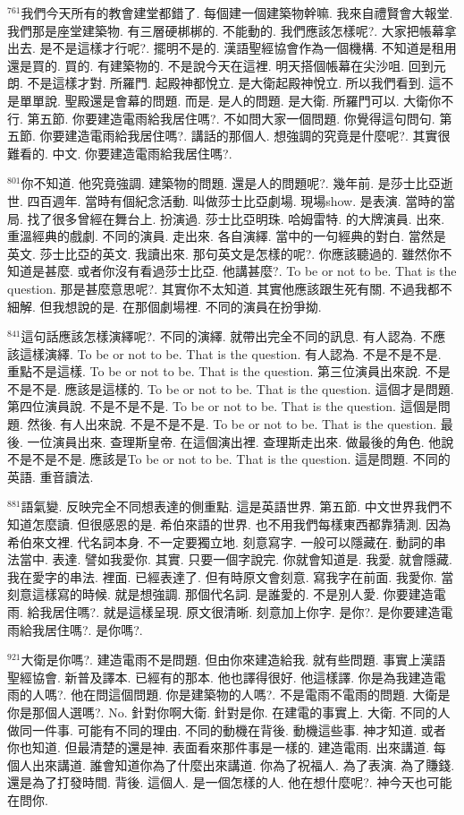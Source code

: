 \documentclass{book}
\begin{document}
$^{761}$我們今天所有的教會建堂都錯了.
每個建一個建築物幹嘛.
我來自禮賢會大報堂.
我們那是座堂建築物.
有三層硬梆梆的.
不能動的.
我們應該怎樣呢?.
大家把帳幕拿出去.
是不是這樣才行呢?.
擺明不是的.
漢語聖經協會作為一個機構.
不知道是租用還是買的.
買的.
有建築物的.
不是說今天在這裡.
明天搭個帳幕在尖沙咀.
回到元朗.
不是這樣才對.
所羅門.
起殿神都悅立.
是大衛起殿神悅立.
所以我們看到.
這不是單單說.
聖殿還是會幕的問題.
而是.
是人的問題.
是大衛.
所羅門可以.
大衛你不行.
第五節.
你要建造電雨給我居住嗎?.
不如問大家一個問題.
你覺得這句問句.
第五節.
你要建造電雨給我居住嗎?.
講話的那個人.
想強調的究竟是什麼呢?.
其實很難看的.
中文.
你要建造電雨給我居住嗎?.

$^{801}$你不知道.
他究竟強調.
建築物的問題.
還是人的問題呢?.
幾年前.
是莎士比亞逝世.
四百週年.
當時有個紀念活動.
叫做莎士比亞劇場.
現場show.
是表演.
當時的當局.
找了很多曾經在舞台上.
扮演過.
莎士比亞明珠.
哈姆雷特.
的大牌演員.
出來.
重溫經典的戲劇.
不同的演員.
走出來.
各自演繹.
當中的一句經典的對白.
當然是英文.
莎士比亞的英文.
我讀出來.
那句英文是怎樣的呢?.
你應該聽過的.
雖然你不知道是甚麼.
或者你沒有看過莎士比亞.
他講甚麼?.
To be or not to be.
That is the question.
那是甚麼意思呢?.
其實你不太知道.
其實他應該跟生死有關.
不過我都不細解.
但我想說的是.
在那個劇場裡.
不同的演員在扮爭拗.

$^{841}$這句話應該怎樣演繹呢?.
不同的演繹.
就帶出完全不同的訊息.
有人認為.
不應該這樣演繹.
To be or not to be.
That is the question.
有人認為.
不是不是不是.
重點不是這樣.
To be or not to be.
That is the question.
第三位演員出來說.
不是不是不是.
應該是這樣的.
To be or not to be.
That is the question.
這個才是問題.
第四位演員說.
不是不是不是.
To be or not to be.
That is the question.
這個是問題.
然後.
有人出來說.
不是不是不是.
To be or not to be.
That is the question.
最後.
一位演員出來.
查理斯皇帝.
在這個演出裡.
查理斯走出來.
做最後的角色.
他說不是不是不是.
應該是To be or not to be.
That is the question.
這是問題.
不同的英語.
重音讀法.

$^{881}$語氣變.
反映完全不同想表達的側重點.
這是英語世界.
第五節.
中文世界我們不知道怎麼讀.
但很感恩的是.
希伯來語的世界.
也不用我們每樣東西都靠猜測.
因為希伯來文裡.
代名詞本身.
不一定要獨立地.
刻意寫字.
一般可以隱藏在.
動詞的串法當中.
表達.
譬如我愛你.
其實.
只要一個字說完.
你就會知道是.
我愛.
就會隱藏.
我在愛字的串法.
裡面.
已經表達了.
但有時原文會刻意.
寫我字在前面.
我愛你.
當刻意這樣寫的時候.
就是想強調.
那個代名詞.
是誰愛的.
不是別人愛.
你要建造電雨.
給我居住嗎?.
就是這樣呈現.
原文很清晰.
刻意加上你字.
是你?.
是你要建造電雨給我居住嗎?.
是你嗎?.

$^{921}$大衛是你嗎?.
建造電雨不是問題.
但由你來建造給我.
就有些問題.
事實上漢語聖經協會.
新普及譯本.
已經有的那本.
他也譯得很好.
他這樣譯.
你是為我建造電雨的人嗎?.
他在問這個問題.
你是建築物的人嗎?.
不是電雨不電雨的問題.
大衛是你是那個人選嗎?.
No.
針對你啊大衛.
針對是你.
在建電的事實上.
大衛.
不同的人做同一件事.
可能有不同的理由.
不同的動機在背後.
動機這些事.
神才知道.
或者你也知道.
但最清楚的還是神.
表面看來那件事是一樣的.
建造電雨.
出來講道.
每個人出來講道.
誰會知道你為了什麼出來講道.
你為了祝福人.
為了表演.
為了賺錢.
還是為了打發時間.
背後.
這個人.
是一個怎樣的人.
他在想什麼呢?.
神今天也可能在問你.
\end{document}
